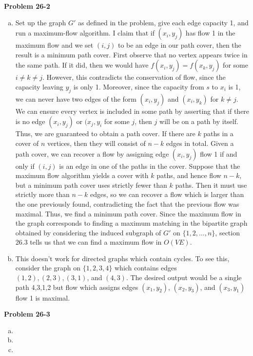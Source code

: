 \documentclass{article}
\begin{document}
\noindent\textbf{Problem 26-2}\\

\begin{enumerate}[a.]
\item Set up the graph $G'$ as defined in the problem, give each edge capacity 1, and run a maximum-flow algorithm.  I claim that if $(x_i, y_j)$ has flow 1 in the maximum flow and we set $(i,j)$ to be an edge in our path cover, then the result is a minimum path cover.  First observe that no vertex appears twice in the same path.  If it did, then we would have $f(x_i, y_j) = f(x_k,y_j)$ for some $i \neq k \neq j$.  However, this contradicts the conservation of flow, since the capacity leaving $y_j$ is only 1.  Moreover, since the capacity from $s$ to $x_i$ is 1, we can never have two edges of the form $(x_i, y_j)$ and $(x_i, y_k)$ for $k \neq j$.  We can ensure every vertex is included in some path by asserting that if there is no edge $(x_i,y_j)$ or $(x_j, y_i$ for some $j$, then $j$ will be on a path by itself.  Thus, we are guaranteed to obtain a path cover.  If there are $k$ paths in a cover of $n$ vertices, then they will consist of $n-k$ edges in total.  Given a path cover, we can recover a flow by assigning edge $(x_i, y_j)$ flow 1 if and only if $(i,j)$ is an edge in one of the paths in the cover.  Suppose that the maximum flow algorithm yields a cover with $k$ paths, and hence flow $n-k$, but a minimum path cover uses strictly fewer than $k$ paths.  Then it must use strictly more than $n-k$ edges, so we can recover a flow which is larger than the one previously found, contradicting the fact that the previous flow was maximal.  Thus, we find a minimum path cover.  Since the maximum flow in the graph corresponds to finding a maximum matching in the bipartite graph obtained by considering the induced subgraph of $G'$ on $\{1,2,\ldots, n\}$, section 26.3 tells us that we can find a maximum flow in $O(VE)$. 

\item This doesn't work for directed graphs which contain cycles.  To see this, consider the graph on $\{1,2,3,4\}$ which contains edges $(1,2), (2,3), (3,1)$, and $(4,3)$.  The desired output would be a single path 4,3,1,2 but flow which assigns edges $(x_1,y_2)$, $(x_2,y_3)$, and $(x_3,y_1)$ flow 1 is maximal. 
\end{enumerate}

\noindent\textbf{Problem 26-3}\\

\begin{enumerate}[a.]
\item
\item
\item
\end{enumerate}
\end{document}
